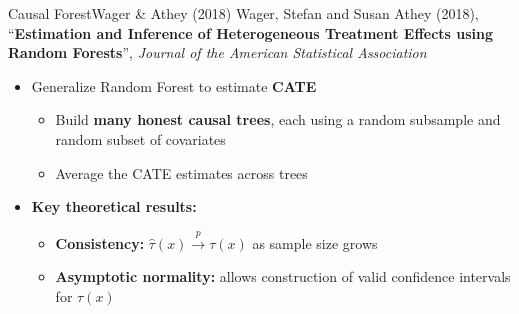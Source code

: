 \documentclass[hyperref={pdfpagelabels=false}]{beamer}
\begin{document}
\author{}
\institute{}
\date{}

\begin{frame}{}
	\titlepage
\end{frame}




\begin{frame}{Causal Forest}{Wager \& Athey (2018)}
	Wager, Stefan and Susan Athey (2018), ``\textbf{Estimation and Inference of Heterogeneous Treatment Effects using Random Forests}'', \textit{Journal of the American Statistical Association}

	\vspace{0.3cm}
	\begin{itemize}
		\item Generalize Random Forest to estimate \textbf{CATE}
		\vspace{0.2cm}
		\begin{itemize}
			\item Build \textbf{many honest causal trees}, each using a random subsample and random subset of covariates
			\vspace{0.2cm}
			\item Average the CATE estimates across trees
		\end{itemize}
		\vspace{0.3cm}
		\item \textbf{Key theoretical results:}
		\vspace{0.2cm}
		\begin{itemize}
			\item \textbf{Consistency:} $\hat{\tau}(x) \xrightarrow{p} \tau(x)$ as sample size grows
			\vspace{0.2cm}
			\item \textbf{Asymptotic normality:} allows construction of valid confidence intervals for $\tau(x)$
		\end{itemize}
	\end{itemize}
\end{frame}
\end{document}
